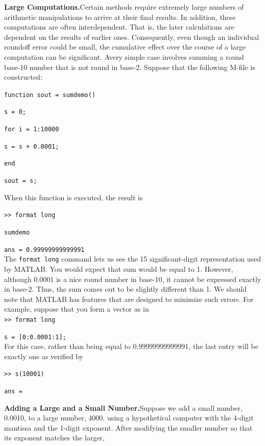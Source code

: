\documentclass[../main.tex]{subfiles}
\begin{document}
\noindent
\textbf{Large Computations.}\quad Certain methods require extremely large numbers of arithmetic
manipulations to arrive at their final results. In addition, these computations are often interdependent.
That is, the later calculations are dependent on the results of earlier ones. Consequently,
even though an individual roundoff error could be small, the cumulative effect
over the course of a large computation can be significant. Avery simple case involves summing
a round base-10 number that is not round in base-2. Suppose that the following M-file
is constructed:

\texttt{function sout = sumdemo()}

\texttt{s = 0;}

\texttt{for i = 1:10000}

\hspace{5 mm}\texttt{s = s + 0.0001;}

\texttt{end}

\texttt{sout = s;}
\newpage

\noindent
When this function is executed, the result is

\texttt{>> format long}

\texttt{sumdemo}

\texttt{ans = 0.99999999999991}\\

The \texttt{format long} command lets us see the 15 significant-digit representation used
by MATLAB. You would expect that sum would be equal to 1. However, although
0.0001 is a nice round number in base-10, it cannot be expressed exactly in base-2. Thus,
the sum comes out to be slightly different than 1. We should note that MATLAB has features
that are designed to minimize such errors. For example, suppose that you form a
vector as in\\

\texttt{>> format long}

\texttt{s = [0:0.0001:1];}\\

\noindent
For this case, rather than being equal to 0.99999999999991, the last entry will be exactly
one as verified by

\texttt{>> s(10001)}

\texttt{ans = }\\
\bigskip

\noindent
\textbf{Adding a Large and a Small Number.}\quad Suppose we add a small number, 0.0010, to a
large number, 4000, using a hypothetical computer with the 4-digit mantissa and the 1-digit
exponent. After modifying the smaller number so that its exponent matches the larger,\\
\end{document}
